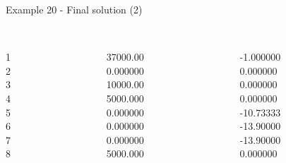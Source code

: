 \begin{frame}{Example 20 - Final solution (2)}
\footnotesize

\begin{columns}[t]
\begin{column}{0.3\textwidth}
\\
1\\
2\\
3\\
4\\
5\\
6\\
7\\
8\\
\end{column}

\begin{column}{0.3\textwidth}
\\
37000.00\\
0.000000\\
10000.00\\
5000.000\\
0.000000\\
0.000000\\
0.000000\\
5000.000\\
\end{column}

\begin{column}{0.3\textwidth}
\\
-1.000000\\
0.000000\\
0.000000\\
0.000000\\
-10.73333\\
-13.90000\\
-13.90000\\
0.000000\\
\end{column}
\end{columns}

\end{frame}


